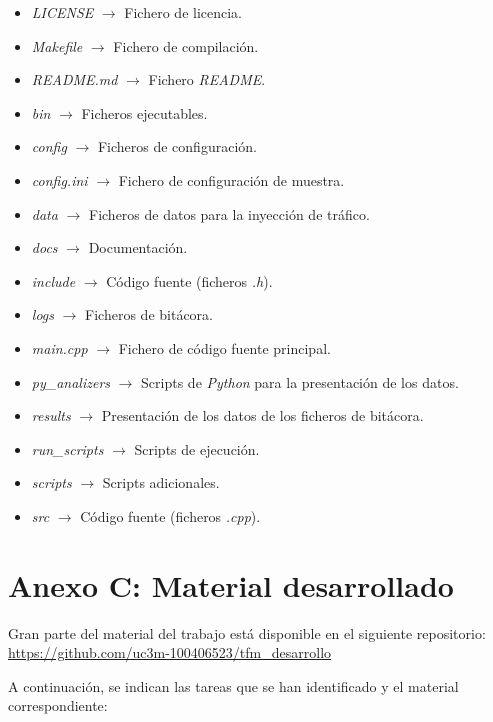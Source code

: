 \documentclass[12pt]{report} %
\begin{document}
\begin{itemize}
\item \textit{LICENSE} $\rightarrow$ Fichero de licencia.
\item \textit{Makefile} $\rightarrow$ Fichero de compilación.
\item \textit{README.md} $\rightarrow$ Fichero \textit{README}.
\item \textit{bin} $\rightarrow$ Ficheros ejecutables.
\item \textit{config} $\rightarrow$ Ficheros de configuración.
\item \textit{config.ini} $\rightarrow$ Fichero de configuración de muestra.
\item \textit{data} $\rightarrow$ Ficheros de datos para la inyección de tráfico.
\item \textit{docs} $\rightarrow$ Documentación.
\item \textit{include} $\rightarrow$ Código fuente (ficheros \textit{.h}).
\item \textit{logs} $\rightarrow$ Ficheros de bitácora.
\item \textit{main.cpp} $\rightarrow$ Fichero de código fuente principal.
\item \textit{py\_analizers} $\rightarrow$ Scripts de \textit{Python} para la presentación de los datos.
\item \textit{results} $\rightarrow$ Presentación de los datos de los ficheros de bitácora.
\item \textit{run\_scripts} $\rightarrow$ Scripts de ejecución.
\item \textit{scripts} $\rightarrow$ Scripts adicionales.
\item \textit{src} $\rightarrow$ Código fuente (ficheros \textit{.cpp}).
\end{itemize}










\chapter* {Anexo C: Material desarrollado}

Gran parte del material del trabajo está disponible en el siguiente repositorio:
\url{https://github.com/uc3m-100406523/tfm_desarrollo}

A continuación, se indican las tareas que se han identificado y el material correspondiente:
\end{document}

